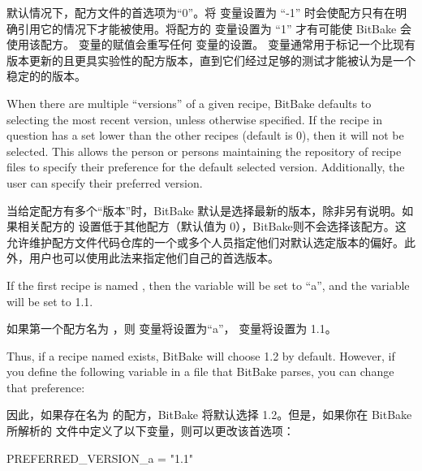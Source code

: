 默认情况下，配方文件的首选项为“0”。将  变量设置为 ``-1'' 时会使配方只有在明确引用它的情况下才能被使用。将配方的  变量设置为 ``1'' 才有可能使 BitBake 会使用该配方。 变量的赋值会重写任何  变量的设置\footnotemark[1]。 变量通常用于标记一个比现有版本更新的且更具实验性的配方版本，直到它们经过足够的测试才能被认为是一个稳定的的版本。


When there are multiple ``versions'' of a given recipe, BitBake defaults to selecting the most recent version, unless otherwise specified. If the recipe in question has a  set lower than the other recipes (default is 0), then it will not be selected. This allows the person or persons maintaining the repository of recipe files to specify their preference for the default selected version. Additionally, the user can specify their preferred version.

当给定配方有多个``版本''时，BitBake 默认是选择最新的版本，除非另有说明。如果相关配方的  设置低于其他配方（默认值为 0），BitBake则不会选择该配方。这允许维护配方文件代码仓库的一个或多个人员指定他们对默认选定版本的偏好。此外，用户也可以使用此法来指定他们自己的首选版本。

If the first recipe is named , then the  variable will be set to ``a'', and the  variable will be set to 1.1.

如果第一个配方名为 ，则  变量将设置为``a''，  变量将设置为 1.1。

Thus, if a recipe named  exists, BitBake will choose 1.2 by default. However, if you define the following variable in a  file that BitBake parses, you can change that preference:

因此，如果存在名为  的配方，BitBake 将默认选择 1.2。但是，如果你在 BitBake 所解析的  文件中定义了以下变量，则可以更改该首选项：

\begin{pyglist}
PREFERRED_VERSION_a = "1.1"
\end{pyglist}

